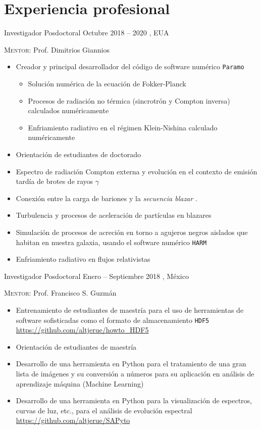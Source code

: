 \section{Experiencia profesional}

\cventry{}%
{\DPA}%
{Investigador Posdoctoral}%
{Octubre 2018 -- 2020}%
{\Purdue, EUA}%
{\textsc{Mentor}: Prof. Dimitrios Giannios%
  \begin{itemize}
    \item Creador y principal desarrollador del código de software numérico \texttt{Paramo}
    \begin{itemize}
      \item Solución numérica de la ecuación de Fokker-Planck
      \item Procesos de radiación no térmica (sincrotrón y Compton inversa) calculados numéricamente 
      \item Enfriamiento radiativo en el régimen Klein-Nishina calculado numéricamente
    \end{itemize}
    \item Orientación de estudiantes de doctorado
    \item Espectro de radiación Compton externa y evolución en el contexto de emisión tardía de brotes de rayos $\gamma$ \cite{Zhang:2020ch}
    \item Conexión entre la carga de bariones y la \emph{secuencia blazar} \cite{RuedaBecerril:2020ha}.
    \item Turbulencia y procesos de aceleración de partículas en blazares
    \item Simulación de procesos de acreción en torno a agujeros negros aislados que habitan en nuestra galaxia, usando el software numérico \texttt{HARM}
    \item Enfriamiento radiativo en flujos relativistas
  \end{itemize}
}
\cventry{}%
{\IFMes}%
{Investigador Posdoctoral}%
{\hspace{-10ex}Enero -- Septiembre 2018}%
{\UMSNHes, México}%
{\textsc{Mentor}: Prof. Francisco S. Guzmán
  \begin{itemize}
    \item Entrenamiento de estudiantes de maestría para el uso de herramientas de software sofisticadas como el formato de almacenamiento \texttt{HDF5} \url{https://github.com/altjerue/howto_HDF5}
    \item Orientación de estudiantes de maestría
    \item Desarrollo de una herramienta en Python para el tratamiento de una gran lista de imágenes y su conversión a números para su aplicación en análisis de aprendizaje máquina (Machine Learning)
    \item Desarrollo de una herramienta en Python para la visualización de espectros, curvas de luz, etc., para el análisis de evolución espectral \url{https://github.com/altjerue/SAPyto}
  \end{itemize}
}
